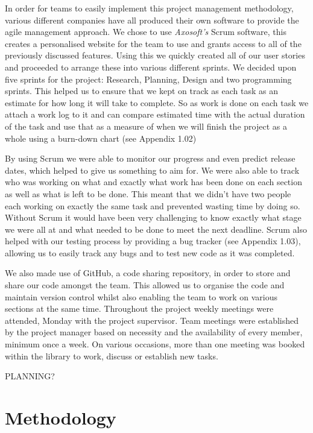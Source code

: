 \documentclass[a4paper]{report}
\begin{document}
In order for teams to easily implement this project management methodology, various different companies have all produced their own software to provide the agile management approach. We chose to use \textit{Axosoft's} Scrum software, this creates a personalised website for the team to use and grants access to all of the previously discussed features. Using this we quickly created all of our user stories and proceeded to arrange these into various different sprints. We decided upon five sprints for the project: Research, Planning, Design and two programming sprints. This helped us to ensure that we kept on track as each task as an estimate for how long it will take to complete. So as work is done on each task we attach a work log to it and can compare estimated time with the actual duration of the task and use that as a measure of when we will finish the project as a whole using a burn-down chart (see Appendix 1.02)

By using Scrum we were able to monitor our progress and even predict release dates, which helped to give us something to aim for. We were also able to track who was working on what and exactly what work has been done on each section as well as what is left to be done. This meant that we didn't have two people each working on exactly the same task and prevented wasting time by doing so. Without Scrum it would have been very challenging to know exactly what stage we were all at and what needed to be done to meet the next deadline. Scrum also helped with our testing process by providing a bug tracker (see Appendix 1.03), allowing us to easily track any bugs and to test new code as it was completed. 

We also made use of GitHub, a code sharing repository, in order to store and share our code amongst the team. This allowed us to organise the code and maintain version control whilst also enabling the team to work on various sections at the same time. Throughout the project weekly meetings were attended, Monday with the project supervisor. Team meetings were established by the project manager based on necessity and the availability of every member, minimum once a week. On various occasions, more than one meeting was booked within the library to work, discuss or establish new tasks.

PLANNING?


\chapter{Methodology}
\end{document}

